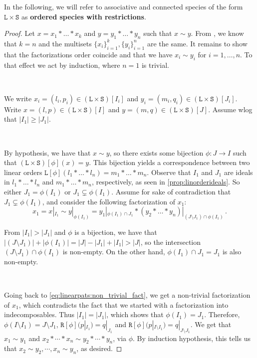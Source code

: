 \documentclass[12pt, reqno]{amsart}
\theoremstyle{definition}
\begin{document}
In the following, we will refer to associative and connected species of the form $\mathtt{L} \times \mathtt{S}$ as \textbf{ordered species with restrictions}.

\begin{proof}
Let $x = x_1 \ast \dots \ast x_k $ and $ y =  y_1 \ast \dots \ast y_n$ such that $x \sim y$.
From \cite[Corollary 3.4.]{Penaguiao2020}, we know that $k = n$ and the multisets $\{x_i\}_{i=1}^k,  \{y_i\}_{i=1}^n$ are the same.
It remains to show that the factorizations order coincide and that we have $x_i \sim y_i$ for $i = 1, \dots , n$.
To that effect we act by induction, where $n = 1$ is trivial.

\

We write $x_i = (l_i, p_i)\in (\mathtt{L}\times \mathtt{S})[I_i]$ and $y_i = (m_i, q_i)\in (\mathtt{L}\times \mathtt{S})[J_i]$.
Write $x = (l, p) \in (\mathtt{L}\times \mathtt{S})[I] $ and $y = (m, q) \in (\mathtt{L}\times \mathtt{S})[J]$.
Assume wlog that $|I_1 | \geq |J_1|$.

\

By hypothesis, we have that $x \sim y$, so there exists some bijection $\phi: J \to I$ such that $ (\mathtt{L}\times \mathtt{S})[\phi](x) = y$.
This bijection yields a correspondence between two linear orders $\mathtt{L} [\phi] (l_1 \ast \dots \ast l_n) = m_1\ast \dots \ast m_n $.
Observe that $I_1$ and $J_1$ are ideals in $l_1 \ast \dots \ast l_n$ and $m_1 \ast \dots \ast m_n$, respectively, as seen in \cref{prop:linorderideals}.
So either $J_1 = \phi (I_1)$ or $J_1 \subsetneq  \phi(I_1) $.
Assume for sake of contradiction that $J_1 \subsetneq  \phi(I_1)$, and consider the following factorization of $x_1 $:
\begin{equation}\label{eq:linearpats:non_trivial_fact}
x_1 = x|_{I_1} \sim y|_{\phi(I_1)} = y_1|_{\phi(I_1) \cap J_1} \ast (y_2 \ast \dots \ast y_n)|_{(J\setminus J_1) \cap \phi(I_1)}\, . 
\end{equation}

From $|I_1| > |J_1|$ and $\phi $ is a bijection, we have that $| (J\setminus J_1) | + | \phi(I_1) | = |J| - |J_1| + |I_1| > |J|$, so the intersection $(J\setminus J_1) \cap \phi(I_1)$ is non-empty.
On the other hand, $\phi(I_1) \cap J_1 = J_1$ is also non-empty.

\

Going back to \eqref{eq:linearpats:non_trivial_fact}, we get a non-trivial factorization of $x_1$, which contradicts the fact that we started with a factorization into indecomposables. Thus $|I_1 | = |J_1|$, which shows that $\phi(I_1) = J_1$.
Therefore,  $\phi(I\setminus I_1) = J \setminus  J_1$, $ \mathtt{R}[\phi] (p|_{I_1}) = q|_{J_1} $ and $ \mathtt{R}[\phi] (p|_{I \setminus I_1}) = q|_{J \setminus J_1} $.
We get that $x_1 \sim y_1$ and $x_2 \ast \cdots \ast x_n \sim y_2 \ast \cdots \ast y_n$, via $\phi$.
By induction hypothesis, this tells us that $x_2 \sim y_2, \cdots , x_n \sim y_n$, as desired.
\end{proof}
\end{document}
